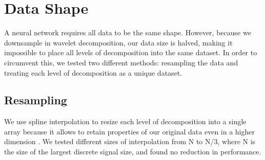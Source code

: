 \documentclass{turabian-thesis}
\begin{document}





















\section{Data Shape}

A neural network requires all data to be the same shape. However, because we downsample in wavelet decomposition, our data size is halved, making it impossible to place all levels of decomposition into the same dataset. In order to circumvent this, we tested two different methods: resampling the data and treating each level of decomposition as a unique dataset.


\subsection{Resampling}

We use spline interpolation to resize each level of decomposition into a single array because it allows to retain properties of our original data even in a higher dimension \cite{gregory_shape_1985}. We tested different sizes of interpolation from N to N/3, where N is the size of the largest discrete signal size, and found no reduction in performance.
 
\end{document}
